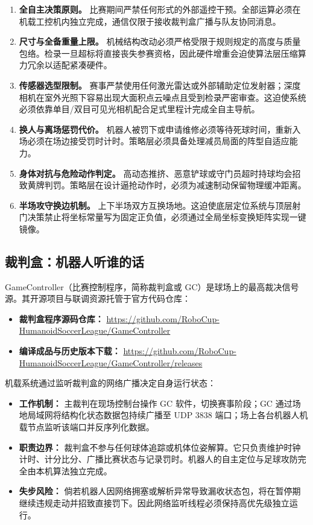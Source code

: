 \begin{enumerate}[leftmargin=*]
    \item \textbf{全自主决策原则。} 比赛期间严禁任何形式的外部遥控干预。全部运算必须在机载工控机内独立完成，通信仅限于接收裁判盒广播与队友协同消息。\official
    \item \textbf{尺寸与全备重量上限。} 机械结构改动必须严格受限于规则规定的高度与质量包络。检录一旦超标将直接丧失参赛资格，因此硬件增重会迫使算法层压缩算力冗余以适配紧凑硬件。
    \item \textbf{传感器选型限制。} 赛事严禁使用任何激光雷达或外部辅助定位发射器；深度相机在室外光照下容易出现大面积点云噪点且受到检录严密审查。这迫使系统必须依靠单目/双目可见光相机配合足式里程计完成全自主导航。
    \item \textbf{换人与离场惩罚代价。} 机器人被罚下或申请维修必须等待死球时间，重新入场必须在场边接受罚时计时。策略层必须具备处理减员局面的阵型自适应能力。
    \item \textbf{身体对抗与危险动作判定。} 高动态推挤、恶意铲球或守门员超时持球均会招致黄牌判罚。策略层在设计逼抢动作时，必须为减速制动保留物理缓冲距离。
    \item \textbf{半场攻守换边机制。} 上下半场双方互换场地。这迫使底层定位系统与顶层射门决策禁止将坐标常量写为固定正负值，必须通过全局坐标变换矩阵实现一键镜像。
\end{enumerate}

\subsection{裁判盒：机器人听谁的话}

GameController（比赛控制程序，简称裁判盒或 GC）是球场上的最高裁决信号源。其开源项目与联调资源托管于官方代码仓库：
\begin{itemize}[leftmargin=*]
    \item \textbf{裁判盒程序源码仓库：} \url{https://github.com/RoboCup-HumanoidSoccerLeague/GameController}
    \item \textbf{编译成品与历史版本下载：} \url{https://github.com/RoboCup-HumanoidSoccerLeague/GameController/releases}
\end{itemize}

机载系统通过监听裁判盒的网络广播决定自身运行状态：

\begin{itemize}[leftmargin=*]
    \item \textbf{工作机制：} 主裁判在现场控制台操作 GC 软件，切换赛事阶段；GC 通过场地局域网将结构化状态数据包持续广播至 UDP 3838 端口；场上各台机器人机载节点监听该端口并反序列化数据。\official
    \item \textbf{职责边界：} 裁判盒不参与任何球体追踪或机体位姿解算。它只负责维护时钟计时、计分比分、广播比赛状态与记录罚时。机器人的自主定位与足球攻防完全由本机算法独立完成。
    \item \textbf{失步风险：} 倘若机器人因网络拥塞或解析异常导致漏收状态包，将在暂停期继续违规走动并招致直接罚下。因此网络监听线程必须保持高优先级独立运行。
\end{itemize}

